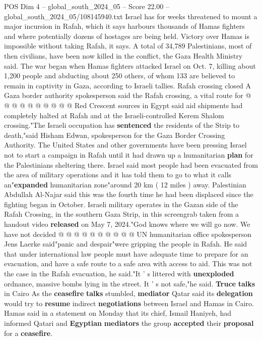 \begin{textsample}{POS Dim 4 – global\_south\_2024\_05 – Score 22.00 – global\_south\_2024\_05/108145940.txt}
Israel has for weeks threatened to mount a major incursion in Rafah, which it says harbours thousands of Hamas fighters and where potentially dozens of hostages are being held.
Victory over Hamas is impossible without taking Rafah, it says.
A total of 34,789 Palestinians, most of then civilians, have been now killed in the conflict, the Gaza Health Ministry said.
The war began when Hamas fighters attacked Israel on Oct. 7, killing about 1,200 people and abducting about 250 others, of whom 133 are believed to remain in captivity in Gaza, according to Israeli tallies.
Rafah crossing closed A Gaza border authority spokesperson said the Rafah crossing, a vital route for @ @ @ @ @ @ @ @ @ @ Red Crescent sources in Egypt said aid shipments had completely halted at Rafah and at the Israeli-controlled Kerem Shalom crossing."The Israeli occupation has \textbf{sentenced} the residents of the Strip to death,"said Hisham Edwan, spokesperson for the Gaza Border Crossing Authority.
The United States and other governments have been pressing Israel not to start a campaign in Rafah until it had drawn up a humanitarian \textbf{plan} for the Palestinians sheltering there.
Israel said most people had been evacuated from the area of military operations and it has told them to go to what it calls an"\textbf{expanded} humanitarian zone"around 20 km ( 12 miles ) away.
Palestinian Abdullah Al-Najar said this was the fourth time he had been displaced since the fighting began in October.
Israeli military operates in the Gazan side of the Rafah Crossing, in the southern Gaza Strip, in this screengrab taken from a handout video \textbf{released} on May 7, 2024."God knows where we will go now.
We have not decided @ @ @ @ @ @ @ @ @ @ UN humanitarian office spokesperson Jens Laerke said"panic and despair"were gripping the people in Rafah.
He said that under international law people must have adequate time to prepare for an evacuation, and have a safe route to a safe area with access to aid.
This was not the case in the Rafah evacuation, he said."It ' s littered with \textbf{unexploded} ordnance, massive bombs lying in the street.
It ' s not safe,"he said. \textbf{Truce} \textbf{talks} in Cairo As the \textbf{ceasefire} \textbf{talks} stumbled, \textbf{mediator} Qatar said its \textbf{delegation} would try to \textbf{resume} indirect \textbf{negotiations} between Israel and Hamas in Cairo.
Hamas said in a statement on Monday that its chief, Ismail Haniyeh, had informed Qatari and \textbf{Egyptian} \textbf{mediators} the group \textbf{accepted} their \textbf{proposal} for a \textbf{ceasefire}.

\end{textsample}
